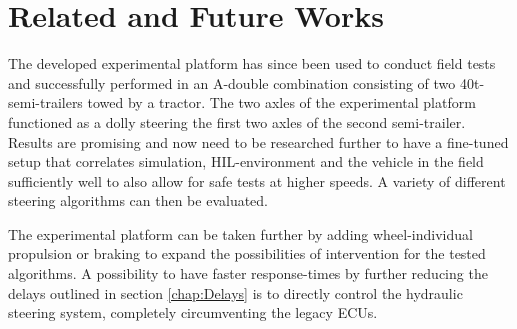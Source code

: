 \documentclass[root.tex]{subfiles}
\begin{document}
	
	{\pagestyle{empty}}
	\section{Related and Future Works}
	\label{chap:Related_works}
	
	The developed experimental platform has since been used to conduct field tests and successfully performed in an A-double combination consisting of two 40t-semi-trailers towed by a tractor. The two axles of the experimental platform functioned as a dolly steering the first two axles of the second semi-trailer. Results are promising and now need to be researched further to have a fine-tuned setup that correlates simulation, \gls{HIL}-environment and the vehicle in the field sufficiently well to also allow for safe tests at higher speeds. A variety of different steering algorithms can then be evaluated.
	
	The experimental platform can be taken further by adding wheel-individual propulsion or braking to expand the possibilities of intervention for the tested algorithms. A possibility to have faster response-times by further reducing the delays outlined in section \ref{chap:Delays} is to directly control the hydraulic steering system, completely circumventing the legacy \gls{ECU}s. 
	
\end{document}
